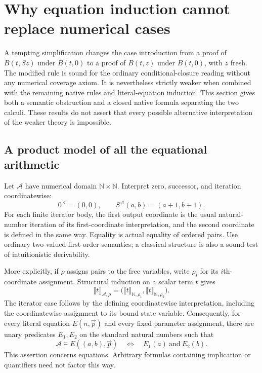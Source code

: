 \section{Why equation induction cannot replace numerical cases}
\label{sec:product-obstruction}

A tempting simplification changes the case introduction from a proof of
$B(t,Sz)$ under $B(t,0)$ to a proof of $B(t,z)$ under $B(t,0)$, with $z$
fresh.  The modified rule is sound for the ordinary conditional-closure
reading without any numerical coverage axiom.  It is nevertheless strictly
weaker when combined with the remaining native rules and literal-equation
induction.  This section gives both a semantic obstruction and a closed
native formula separating the two calculi.  These results do not assert
that every possible alternative interpretation of the weaker theory is
impossible.

\subsection{A product model of all the equational arithmetic}

Let $\mathcal A$ have numerical domain $\mathbb N\times\mathbb N$.  Interpret
zero, successor, and iteration coordinatewise:
\[
 0^{\mathcal A}=(0,0),\qquad
 S^{\mathcal A}(a,b)=(a+1,b+1).
\]
For each finite iterator body, the first output coordinate is the usual
natural-number iteration of its first-coordinate interpretation, and the
second coordinate is defined in the same way.  Equality is actual equality
of ordered pairs.  Use ordinary two-valued first-order semantics; a
classical structure is also a sound test of intuitionistic derivability.

More explicitly, if $\rho$ assigns pairs to the free variables, write
$\rho_i$ for its $i$th-coordinate assignment.  Structural induction on a
scalar term $t$ gives
\begin{equation}
 \llbracket t\rrbracket_{\mathcal A,\rho}
 =\bigl(\llbracket t\rrbracket_{\mathbb N,\rho_1},
         \llbracket t\rrbracket_{\mathbb N,\rho_2}\bigr).
 \label{eq:product-term-factorization}
\end{equation}
The iterator case follows by the defining coordinatewise interpretation,
including the coordinatewise assignment to its bound state variable.
Consequently, for every literal equation $E(n,\vec p)$ and every fixed
parameter assignment, there are unary predicates $E_1,E_2$ on the standard
natural numbers such that
\[
 \mathcal A\models E((a,b),\vec p)
 \quad\Longleftrightarrow\quad E_1(a)\ \text{and}\ E_2(b).
\]
This assertion concerns equations.  Arbitrary formulas containing
implication or quantifiers need not factor this way.

